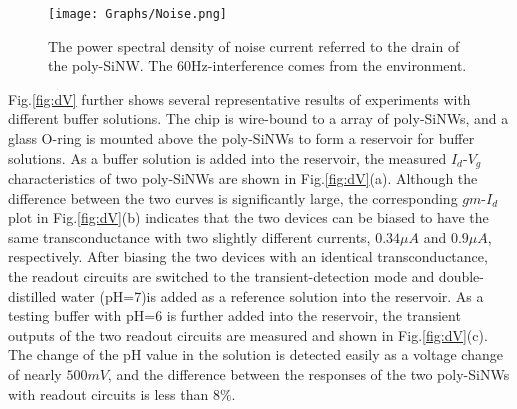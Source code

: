 \documentclass{article}
\begin{document}
\begin{figure}[!htb]
        \centering
        \texttt{[image: Graphs/Noise.png]}
    \caption{The power spectral density of noise current referred to the drain of the poly-SiNW.
    The 60Hz-interference comes from the environment.}
    \label{fig:noise}
\end{figure}

Fig.\ref{fig:dV} further shows several representative results
of experiments with different buffer solutions.
The chip is wire-bound to a array of poly-SiNWs,
and a glass O-ring is mounted above the poly-SiNWs to form a reservoir for buffer solutions.
As a buffer solution is added into the reservoir,
the measured $I_{d}$-$V_{g}$ characteristics of two poly-SiNWs are shown in Fig.\ref{fig:dV}(a).
Although the difference between the two curves is significantly large,
the corresponding $gm$-$I_{d}$ plot in Fig.\ref{fig:dV}(b) indicates that the two devices
can be biased to have the same transconductance with two slightly different currents, $0.34\mu A$ and $0.9\mu A$, respectively.
After biasing the two devices with an identical transconductance,
the readout circuits are switched to the transient-detection mode
and double-distilled water (pH=7)is added as a reference solution into the reservoir.
As a testing buffer with pH=6 is further added into the reservoir,
the transient outputs of the two readout circuits are measured and shown in
 Fig.\ref{fig:dV}(c). The change of the pH value in the solution is detected easily
 as a voltage change of nearly $500 mV$, and the difference between the responses of the
 two poly-SiNWs with readout circuits is less than $8\%$.
\end{document}
